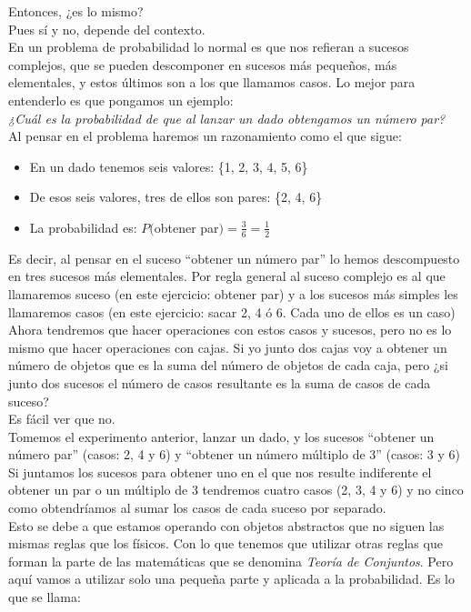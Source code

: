 \documentclass[a4paper,10pt,answers]{exam}
\begin{document}
Entonces, ¿es lo mismo?\\
Pues sí y no, depende del contexto.\\

En un problema de probabilidad lo normal es que nos refieran a sucesos complejos, que se pueden descomponer en sucesos más pequeños, más elementales, y estos últimos son a los que llamamos casos. Lo mejor para entenderlo es que pongamos un ejemplo:\\
\emph{¿Cuál es la probabilidad de que al lanzar un dado obtengamos un número par?}\\
Al pensar en el problema haremos un razonamiento como el que sigue:
\begin{itemize}
	\item En un dado tenemos seis valores: \{1, 2, 3, 4, 5, 6\}
	\item De esos seis valores, tres de ellos son pares: \{2, 4, 6\}
	\item La probabilidad es: $P($obtener par$) = \frac{3}{6} = \frac{1}{2}$
\end{itemize}
Es decir, al pensar en el suceso ``obtener un número par'' lo hemos descompuesto en tres sucesos más elementales. Por regla general al suceso complejo es al que llamaremos suceso (en este ejercicio: obtener par) y a los sucesos más simples les llamaremos casos (en este ejercicio: sacar 2, 4 ó 6. Cada uno de ellos es un caso)\\

Ahora tendremos que hacer operaciones con estos casos y sucesos, pero no es lo mismo que hacer operaciones con cajas.
Si yo junto dos cajas voy a obtener un número de objetos que es la suma del número de objetos de cada caja, pero ¿si junto dos sucesos el número de casos resultante es la suma de casos de cada suceso?\\
Es fácil ver que no.\\
Tomemos el experimento anterior, lanzar un dado, y los sucesos ``obtener un número par'' (casos: 2, 4 y 6) y ``obtener un número múltiplo de 3'' (casos: 3 y 6) Si juntamos los sucesos para obtener uno en el que nos resulte indiferente el obtener un par o un múltiplo de 3 tendremos cuatro casos (2, 3, 4 y 6) y no cinco como obtendríamos al sumar los casos de cada suceso por separado.\\
Esto se debe a que estamos operando con objetos abstractos que no siguen las mismas reglas que los físicos. Con lo que tenemos que utilizar otras reglas que forman la parte de las matemáticas que se denomina \emph{Teoría de Conjuntos}. Pero aquí vamos a utilizar solo una pequeña parte y aplicada a la probabilidad. Es lo que se llama:
\end{document}
